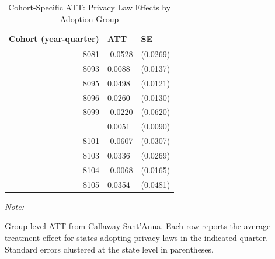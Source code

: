 \begin{table}[!h]
\centering
\caption{\label{tab:tab:group}Cohort-Specific ATT: Privacy Law Effects by Adoption Group}
\centering
\begin{threeparttable}
\begin{tabular}[t]{rll}
\toprule
Cohort (year-quarter) & ATT & SE\\
\midrule
8081 & -0.0528 & (0.0269)\\
8093 & 0.0088 & (0.0137)\\
8095 & 0.0498 & (0.0121)\\
8096 & 0.0260 & (0.0130)\\
8099 & -0.0220 & (0.0620)\\
\addlinespace
8100 & 0.0051 & (0.0090)\\
8101 & -0.0607 & (0.0307)\\
8103 & 0.0336 & (0.0269)\\
8104 & -0.0068 & (0.0165)\\
8105 & 0.0354 & (0.0481)\\
\bottomrule
\end{tabular}
\begin{tablenotes}
\item \textit{Note: } 
\item Group-level ATT from Callaway-Sant'Anna. Each row reports the average treatment effect for states adopting privacy laws in the indicated quarter. Standard errors clustered at the state level in parentheses.
\end{tablenotes}
\end{threeparttable}
\end{table}
